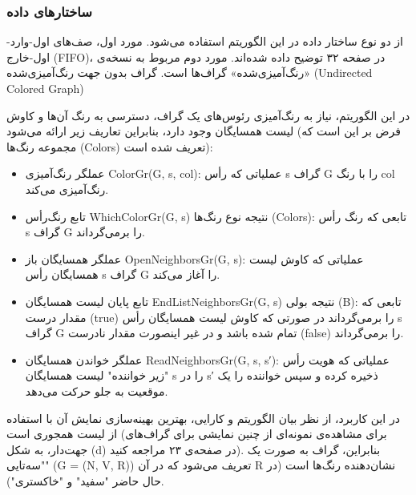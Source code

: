 \documentclass{book} %
\begin{document}
\subsubsection*{ساختارهای داده}

از دو نوع ساختار داده در این الگوریتم استفاده می‌شود. مورد اول، صف‌های اول-وارد-اول-خارج (FIFO)، در صفحه ۳۲ توضیح داده شده‌اند. مورد دوم مربوط به نسخه‌ی «رنگ‌آمیزی‌شده» گراف‌ها است.
گراف بدون جهت رنگ‌آمیزی‌شده (Undirected Colored Graph)

در این الگوریتم، نیاز به رنگ‌آمیزی رئوس‌های یک گراف، دسترسی به رنگ آن‌ها و کاوش لیست همسایگان وجود دارد، بنابراین تعاریف زیر ارائه می‌شود (فرض بر این است که مجموعه رنگ‌ها (Colors) تعریف شده است):

\begin{itemize}
    \item عملگر رنگ‌آمیزی‌ ColorGr(G, s, col): عملیاتی که رأس s گراف G را با رنگ col رنگ‌آمیزی می‌کند.
   
    \item تابع رنگ‌رأس‌ WhichColorGr(G, s) نتیجه نوع رنگ‌ها (Colors): تابعی که رنگ رأس s گراف G را برمی‌گرداند.
   
    \item عملگر همسایگان باز OpenNeighborsGr(G, s): عملیاتی که کاوش لیست همسایگان رأس s گراف G را آغاز می‌کند.
   
    \item تابع پایان لیست همسایگان‌ EndListNeighborsGr(G, s) نتیجه بولی (B): تابعی که مقدار درست (true) را برمی‌گرداند در صورتی که کاوش لیست همسایگان رأس s گراف G تمام شده باشد و در غیر اینصورت مقدار نادرست (false) را برمی‌گرداند.
   
    \item عملگر خواندن همسایگان‌ ReadNeighborsGr(G, s, s′): عملیاتی که هویت رأس "زیر خواننده" لیست همسایگان s را در s′ ذخیره کرده و سپس خواننده را یک موقعیت به جلو حرکت می‌دهد.

\end{itemize}

در این کاربرد، از نظر بیان الگوریتم و کارایی، بهترین بهینه‌سازی نمایش آن با استفاده از لیست همجوری است (برای مشاهده‌ی نمونه‌ای از چنین نمایشی برای گراف‌های جهت‌دار، به شکل (d) در صفحه‌ی ۲۳ مراجعه کنید). بنابراین، گراف به صورت یک "سه‌تایی" (G = (N, V, R)) تعریف می‌شود که در آن R نشان‌دهنده رنگ‌ها است (در حال حاضر "سفید" و "خاکستری").
\end{document}
